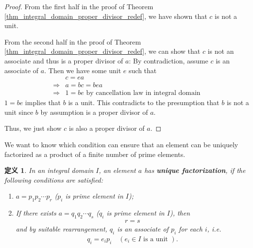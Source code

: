\documentclass[utf8]{ctexbook}
\newtheorem{definition}{定义}[section]
\begin{document}
\begin{proof}
From the first half in the proof of Theorem \ref{thm_integral_domain_proper_divisor_redef}, we have shown that $c$ is not a unit.

From the second half in the proof of Theorem \ref{thm_integral_domain_proper_divisor_redef}, we can show that $c$ is not an associate and thus is a proper divisor of $a$: By contradiction, assume $c$ is an associate of $a$. Then we have some unit $e$ such that
\begin{align*}
& c = e a \\
\Longrightarrow & a = b c = b e a \\
\Longrightarrow & 1 = b e \mbox{ by cancellation law in integral domain}
\end{align*}
$ 1 = be $ implies that $b$ is a unit. This contradicts to the presumption that $b$ is not a unit since $b$ by assumption is a proper divisor of $a$.

Thus, we just show $c$ is also a proper divisor of $a$.
\end{proof}

We want to know which condition can ensure that an element can be uniquely factorized as a product of a finite number of prime elements.

\begin{definition}\label{def_integral_domain_unique_factorization}
In an integral domain $I$, an element $a$ has \textbf{unique factorization}, if the following conditions are satisfied:
\begin{enumerate}
\item{$a = p_1 p_2 \cdots p_r$ ($p_i$ is prime element in $I$);}
\item{If there exists $a = q_1 q_2 \cdots q_s$ ($q_i$ is prime element in $I$), then
\begin{align*}
r = s
\end{align*}
and by suitable rearrangement, $q_i$ is an associate of $p_i$ for each $i$, i.e.
\begin{align*}
q_i = e_i p_i \quad ( e_i \in I \mbox{ is a unit } ).
\end{align*}  
}
\end{enumerate}
\end{definition}
\end{document}
